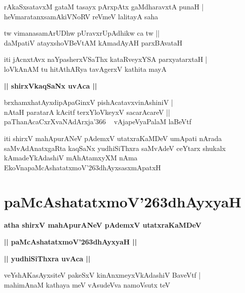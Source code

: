\documentclass[twoside,12pt,openright]{book}
\def\S{\char'263}
\newcounter{shloka}[chapter]
\def\uvaca#1{\centerline{{\large\textbf{#1}}}}
\begin{document}
\begin{shloka}%
rAkaSxsatavxM gataM tasayx pArxpAtx gaMdharavxtA punaH |\\
heVmaratanxsamAkiVNoRV reVmeV lalitayA saha 
\end{shloka}

\begin{shloka}%
tw vimanasamArUDhw pUravxrUpAdhikw ca tw ||\\
daMpatiV atayxshoVBeVtAM kAmadAyAH parxBAvataH
\end{shloka}

\begin{shloka}%
iti jAcnxtAvx naYpasherxVSaThx kataRveyxYSA parxyatarxtaH |\\
loVkAnAM tu hitAthARya tavAgerxV kathita mayA 
\end{shloka}

\uvaca{|| shirxVkaqSaNx uvAca ||}

\begin{shloka}%
brxhamxhatAyxdipApaGinxV pishAcatavxvinAshiniV |\\
nAtaH paratarA kAcitf terxYloVkeyxV sacarAcareV ||\\
paThanAcaCxrXvaNAdArxja\char'366 ~ vAjapeVyaPalaM laBeVtf
\end{shloka}

\begin{center}
iti shirxV mahApurANeV pAdemxV utatxraKaMDeV umApati nArada saMvAdAnatxgaRta kaqSaNx yudhiSiThxra 
saMvAdeV ceYtarx shukalx kAmadeYkAdashiV mAhAtamxyXM nAma EkoVnapaMcAshatatxmoV\S dhAyxsasxmApatxH
\end{center}

\chapter{paMcAshatatxmoV\S dhAyxyaH}

\begin{center}
{\LARGE\bfseries atha shirxV mahApurANeV pAdemxV utatxraKaMDeV}
\end{center}

\begin{center}
{\LARGE\bfseries || paMcAshatatxmoV\S dhAyxyaH ||}
\end{center}

\uvaca{|| yudhiSiThxra uvAca ||}

\begin{shloka}%
veYshAKasAyxsiteV pakeSxV kinAnxmeyxVkAdashiV BaveVtf |\\
mahimAnaM kathaya meV vAsudeVva namoVsutx teV
\end{shloka}
\end{document}
